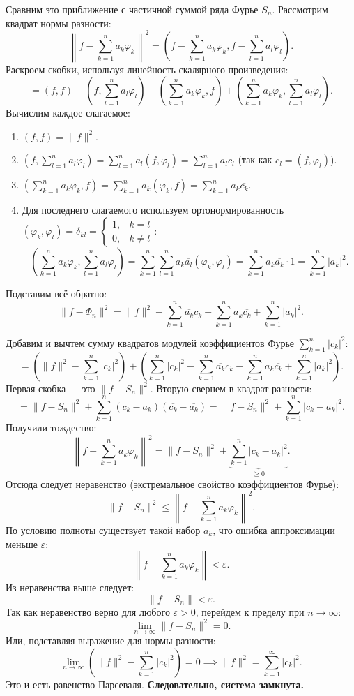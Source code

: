 \documentclass[12pt,a4paper,openany]{book}
\begin{document}
Сравним это приближение с частичной суммой ряда Фурье $S_n$.
Рассмотрим квадрат нормы разности:
\[
\left\| f - \sum_{k=1}^n a_k \varphi_k \right\|^2 = \left( f - \sum_{k=1}^n a_k \varphi_k, f - \sum_{l=1}^n a_l \varphi_l \right).
\]
Раскроем скобки, используя линейность скалярного произведения:
\[
= (f, f) - \left( f, \sum_{l=1}^n a_l \varphi_l \right) - \left( \sum_{k=1}^n a_k \varphi_k, f \right) + \left( \sum_{k=1}^n a_k \varphi_k, \sum_{l=1}^n a_l \varphi_l \right).
\]
Вычислим каждое слагаемое:
\begin{enumerate}
    \item $(f, f) = \|f\|^2$.
    \item $\left( f, \sum_{l=1}^n a_l \varphi_l \right) = \sum_{l=1}^n \overline{a_l} (f, \varphi_l) = \sum_{l=1}^n \overline{a_l} c_l$ (так как $c_l = (f, \varphi_l)$).
    \item $\left( \sum_{k=1}^n a_k \varphi_k, f \right) = \sum_{k=1}^n a_k ( \varphi_k, f ) = \sum_{k=1}^n a_k \overline{c_k}$.
    \item Для последнего слагаемого используем ортонормированность $(\varphi_k, \varphi_l) = \delta_{kl} = \begin{cases} 1, & k=l \\ 0, & k \neq l \end{cases}$:
    \[
    \left( \sum_{k=1}^n a_k \varphi_k, \sum_{l=1}^n a_l \varphi_l \right) = \sum_{k=1}^n \sum_{l=1}^n a_k \overline{a_l} (\varphi_k, \varphi_l) = \sum_{k=1}^n a_k \overline{a_k} \cdot 1 = \sum_{k=1}^n |a_k|^2.
    \]
\end{enumerate}

Подставим всё обратно:
\[
\| f - \Phi_n \|^2 = \|f\|^2 - \sum_{k=1}^n \overline{a_k} c_k - \sum_{k=1}^n a_k \overline{c_k} + \sum_{k=1}^n |a_k|^2.
\]

Добавим и вычтем сумму квадратов модулей коэффициентов Фурье $\sum_{k=1}^n |c_k|^2$:
\[
= \left( \|f\|^2 - \sum_{k=1}^n |c_k|^2 \right) + \left( \sum_{k=1}^n |c_k|^2 - \sum_{k=1}^n \overline{a_k} c_k - \sum_{k=1}^n a_k \overline{c_k} + \sum_{k=1}^n |a_k|^2 \right).
\]
Первая скобка — это $\|f - S_n\|^2$. Вторую свернем в квадрат разности:
\[
= \|f - S_n\|^2 + \sum_{k=1}^n (c_k - a_k)(\overline{c_k} - \overline{a_k}) = \|f - S_n\|^2 + \sum_{k=1}^n |c_k - a_k|^2.
\]
Получили тождество:
\[
\left\| f - \sum_{k=1}^n a_k \varphi_k \right\|^2 = \|f - S_n\|^2 + \underbrace{\sum_{k=1}^n |c_k - a_k|^2}_{\ge 0}.
\]
Отсюда следует неравенство (экстремальное свойство коэффициентов Фурье):
\[
\|f - S_n\|^2 \le \left\| f - \sum_{k=1}^n a_k \varphi_k \right\|^2.
\]
По условию полноты существует такой набор $a_k$, что ошибка аппроксимации меньше $\varepsilon$:
\[
\left\| f - \sum_{k=1}^n a_k \varphi_k \right\| < \varepsilon.
\]
Из неравенства выше следует:
\[
\|f - S_n\| < \varepsilon.
\]
Так как неравенство верно для любого $\varepsilon > 0$, перейдем к пределу при $n \to \infty$:
\[
\lim_{n \to \infty} \|f - S_n\|^2 = 0.
\]
Или, подставляя выражение для нормы разности:
\[
\lim_{n \to \infty} \left( \|f\|^2 - \sum_{k=1}^n |c_k|^2 \right) = 0 \implies \|f\|^2 = \sum_{k=1}^\infty |c_k|^2.
\]
Это и есть равенство Парсеваля.
\textbf{Следовательно, система замкнута.}
\end{document}
